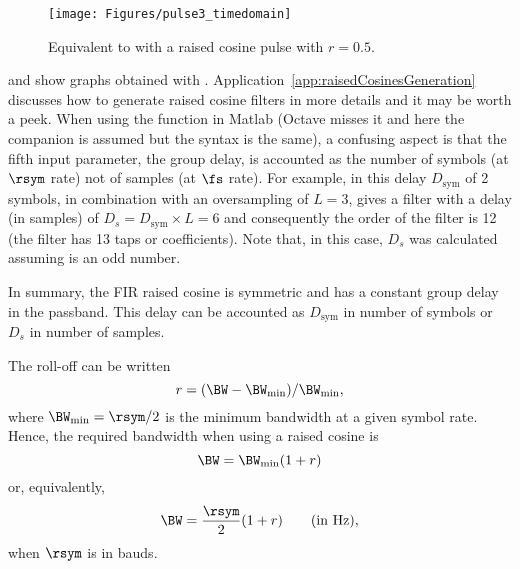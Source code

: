 \begin{figure}[htbp]
\centering
\texttt{[image: Figures/pulse3\_timedomain]}
\caption{Equivalent to  with a raised cosine pulse with $r=0.5$.\label{fig:pulse3_timedomain}}
\end{figure}


 and  show graphs obtained with .
Application~\ref{app:raisedCosinesGeneration} discusses how to generate raised cosine filters in more details and it may be worth a peek. When using the  function in Matlab (Octave misses it and here the companion  is assumed but the syntax is the same), a confusing aspect is that the fifth input parameter, the group delay, is accounted as the number of symbols (at $\rsym$ rate) not of samples (at $\fs$ rate). For example, in  this delay $D_{\textrm{sym}}$ of 2 symbols, in combination with an oversampling of $L=3$, gives a filter with a delay (in samples) of $D_s=D_{\textrm{sym}} \times L=6$ and consequently the order of the filter is 12 (the filter has 13 taps or coefficients). Note that, in this case, $D_s$ was calculated assuming  is an odd number.

In summary, the FIR raised cosine is symmetric and has a constant group delay in the passband. This delay can be accounted as $D_{\textrm{sym}}$ in number of symbols or $D_s$ in number of samples.

The roll-off can be written
\[r=(\BW-\BW_{\textrm{min}})/\BW_{\textrm{min}},\]
where $\BW_{\textrm{min}}=\rsym/2$ is the minimum bandwidth at a given symbol rate. Hence, the required bandwidth when using a raised cosine is
\[
\BW=\BW_{\textrm{min}} (1+r)
\]
or, equivalently,
\[\BW=\frac{\rsym}{2} (1+r)~~~~~~\textrm{(in Hz)},\]
when $\rsym$ is in bauds.


